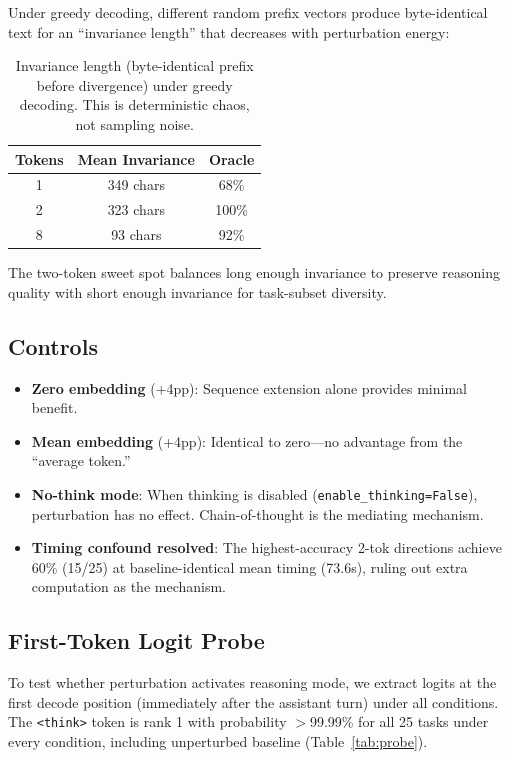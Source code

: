\documentclass{article}
\begin{document}
Under greedy decoding, different random prefix vectors produce
byte-identical text for an ``invariance length'' that decreases with
perturbation energy:

\begin{table}[h]
\centering
\begin{tabular}{ccc}
\toprule
\textbf{Tokens} & \textbf{Mean Invariance} & \textbf{Oracle} \\
\midrule
1 & 349 chars & 68\% \\
2 & 323 chars & 100\% \\
8 & 93 chars & 92\% \\
\bottomrule
\end{tabular}
\caption{Invariance length (byte-identical prefix before divergence)
under greedy decoding. This is deterministic chaos, not sampling noise.}
\label{tab:invariance}
\end{table}

The two-token sweet spot balances long enough invariance to preserve
reasoning quality with short enough invariance for task-subset diversity.

\subsection{Controls} %

\begin{itemize}
    \item \textbf{Zero embedding} (+4pp): Sequence extension alone
    provides minimal benefit.
    \item \textbf{Mean embedding} (+4pp): Identical to zero---no
    advantage from the ``average token.''
    \item \textbf{No-think mode}: When thinking is disabled
    (\texttt{enable\_thinking=False}), perturbation has no effect.
    Chain-of-thought is the mediating mechanism.
    \item \textbf{Timing confound resolved}: The highest-accuracy
    2-tok directions achieve 60\% (15/25) at baseline-identical mean
    timing (73.6s), ruling out extra computation as the mechanism.
\end{itemize}

\subsection{First-Token Logit Probe} %
\label{sec:probe}

To test whether perturbation activates reasoning mode, we extract
logits at the first decode position (immediately after the assistant
turn) under all conditions. The \texttt{<think>} token is rank 1
with probability $>$99.99\% for all 25 tasks under every condition,
including unperturbed baseline (Table~\ref{tab:probe}).
\end{document}
